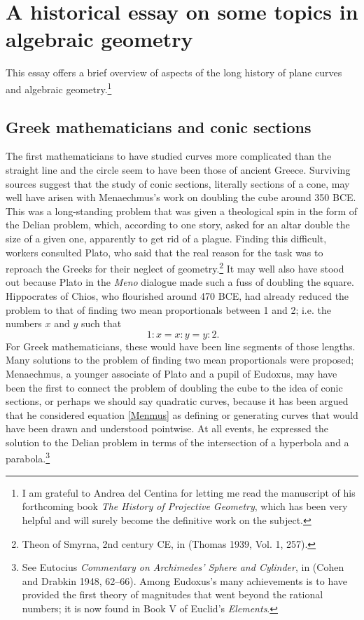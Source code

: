 \documentclass[11pt]{article}
\begin{document}
\section{A historical essay on some topics in algebraic geometry}
This essay offers a brief overview of aspects of the long history of plane curves and algebraic geometry.\footnote{I am grateful to Andrea del Centina for letting me read the manuscript of his forthcoming book \emph{The History of Projective Geometry}, which has been very helpful and will surely become the definitive work on the subject.}   

\subsection{Greek mathematicians and conic sections}
The first mathematicians to have studied curves more complicated than the straight line and the circle seem to have been those of ancient Greece.  Surviving sources suggest that the study of conic sections, literally sections of a cone, may well have arisen with Menaechmus's work on doubling the cube around 350 BCE. This was a long-standing problem that was given a theological spin in the form of the Delian problem, which, according to one story, asked for an altar double the size of a given one, apparently to get rid of a plague. Finding this difficult, workers consulted Plato, who said that the real reason for the task was to reproach the Greeks for their neglect of geometry.\footnote{Theon of Smyrna, 2nd century CE, in (Thomas 1939, Vol. 1, 257).}
It may well also have stood out because Plato in the \emph{Meno} dialogue made such a fuss of doubling the square. Hippocrates of Chios, who flourished around 470 BCE,  had already reduced the problem to that of finding two mean proportionals between 1 and 2; i.e. the numbers $x$ and $y$ such that 
\begin{equation}~\label{Menmus}
1:x= x:y = y: 2.
\end{equation}
For Greek mathematicians, these would have been line segments of those lengths. Many solutions to the problem of finding two mean proportionals were proposed; Menaechmus, a younger associate of Plato and a pupil of Eudoxus, may have been the first to connect the problem of doubling the cube to the idea of conic sections, or perhaps we should say quadratic curves, because it has been argued that he considered equation \eqref{Menmus} as defining or generating curves that would have been drawn and understood pointwise. At all events, he expressed the solution to the Delian problem in terms of the intersection of a hyperbola and a parabola.\footnote{See Eutocius \emph{Commentary on Archimedes' Sphere and Cylinder}, in (Cohen and Drabkin 1948, 62--66). Among Eudoxus's many achievements is to have provided the first theory of magnitudes that went beyond the rational numbers; it is now found in Book V of Euclid's \emph{Elements}.}
\end{document}
